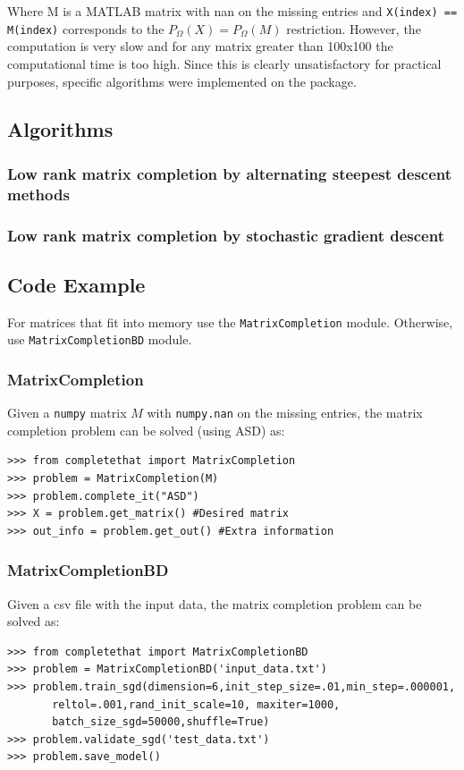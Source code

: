 \documentclass[12pt]{article}
\begin{document}
Where M is a MATLAB matrix with nan on the missing entries and \texttt{X(index) == M(index)} corresponds to the $P_{\Omega}(X) = P_{\Omega}(M)$ restriction. However, the computation is very slow and for any matrix greater than 100x100 the computational time is too high. Since this is clearly unsatisfactory for practical purposes, specific algorithms were implemented on the package. 

\subsection*{Algorithms}
\subsubsection*{Low rank matrix completion by alternating steepest descent methods}
\subsubsection*{Low rank matrix completion by stochastic gradient descent}

\subsection*{Code Example}
For matrices that fit into memory use the \texttt{MatrixCompletion} module. Otherwise, use \texttt{MatrixCompletionBD} module. 

\subsubsection*{MatrixCompletion}
Given a \texttt{numpy} matrix $M$ with \texttt{numpy.nan} on the missing entries, the matrix completion problem can be solved (using ASD) as:
\begin{verbatim}
>>> from completethat import MatrixCompletion
>>> problem = MatrixCompletion(M)
>>> problem.complete_it("ASD")
>>> X = problem.get_matrix() #Desired matrix
>>> out_info = problem.get_out() #Extra information
\end{verbatim}

\subsubsection*{MatrixCompletionBD}
Given a csv file with the input data, the matrix completion problem can be solved as:

\begin{verbatim}
>>> from completethat import MatrixCompletionBD
>>> problem = MatrixCompletionBD('input_data.txt')
>>> problem.train_sgd(dimension=6,init_step_size=.01,min_step=.000001, 
       reltol=.001,rand_init_scale=10, maxiter=1000,
       batch_size_sgd=50000,shuffle=True)
>>> problem.validate_sgd('test_data.txt')
>>> problem.save_model()
\end{verbatim}
\end{document}
